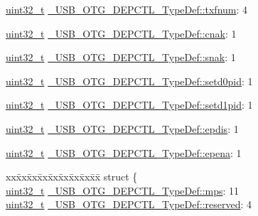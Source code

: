 \begin{DoxyCompactItemize}
\item 
\hyperlink{stdint_8h_a435d1572bf3f880d55459d9805097f62}{uint32\-\_\-t} \hyperlink{group___u_s_b___o_t_g___d_r_i_v_e_r_ga44558e437642307114827cdb9ca99c90}{\-\_\-\-U\-S\-B\-\_\-\-O\-T\-G\-\_\-\-D\-E\-P\-C\-T\-L\-\_\-\-Type\-Def\-::txfnum}\-: 4
\item 
\hyperlink{stdint_8h_a435d1572bf3f880d55459d9805097f62}{uint32\-\_\-t} \hyperlink{group___u_s_b___o_t_g___d_r_i_v_e_r_ga3e56a457c5ef0c5073133f6136baef92}{\-\_\-\-U\-S\-B\-\_\-\-O\-T\-G\-\_\-\-D\-E\-P\-C\-T\-L\-\_\-\-Type\-Def\-::cnak}\-: 1
\item 
\hyperlink{stdint_8h_a435d1572bf3f880d55459d9805097f62}{uint32\-\_\-t} \hyperlink{group___u_s_b___o_t_g___d_r_i_v_e_r_ga12a5b369b36732e560b814f77a5b4f28}{\-\_\-\-U\-S\-B\-\_\-\-O\-T\-G\-\_\-\-D\-E\-P\-C\-T\-L\-\_\-\-Type\-Def\-::snak}\-: 1
\item 
\hyperlink{stdint_8h_a435d1572bf3f880d55459d9805097f62}{uint32\-\_\-t} \hyperlink{group___u_s_b___o_t_g___d_r_i_v_e_r_ga5352bfdd79679f5fba2e20e336c0d48f}{\-\_\-\-U\-S\-B\-\_\-\-O\-T\-G\-\_\-\-D\-E\-P\-C\-T\-L\-\_\-\-Type\-Def\-::setd0pid}\-: 1
\item 
\hyperlink{stdint_8h_a435d1572bf3f880d55459d9805097f62}{uint32\-\_\-t} \hyperlink{group___u_s_b___o_t_g___d_r_i_v_e_r_gad8a3a72618af4a2c5134a74458fae380}{\-\_\-\-U\-S\-B\-\_\-\-O\-T\-G\-\_\-\-D\-E\-P\-C\-T\-L\-\_\-\-Type\-Def\-::setd1pid}\-: 1
\item 
\hyperlink{stdint_8h_a435d1572bf3f880d55459d9805097f62}{uint32\-\_\-t} \hyperlink{group___u_s_b___o_t_g___d_r_i_v_e_r_gab79051b0a8cc476d1e35fe02598a7989}{\-\_\-\-U\-S\-B\-\_\-\-O\-T\-G\-\_\-\-D\-E\-P\-C\-T\-L\-\_\-\-Type\-Def\-::epdis}\-: 1
\item 
\hyperlink{stdint_8h_a435d1572bf3f880d55459d9805097f62}{uint32\-\_\-t} \hyperlink{group___u_s_b___o_t_g___d_r_i_v_e_r_ga6cdb48720ad4a0114da47efd4055860b}{\-\_\-\-U\-S\-B\-\_\-\-O\-T\-G\-\_\-\-D\-E\-P\-C\-T\-L\-\_\-\-Type\-Def\-::epena}\-: 1
\item 
\begin{tabbing}
xx\=xx\=xx\=xx\=xx\=xx\=xx\=xx\=xx\=\kill
struct \{\\
\>\hyperlink{stdint_8h_a435d1572bf3f880d55459d9805097f62}{uint32\_t} \hyperlink{group___u_s_b___o_t_g___d_r_i_v_e_r_gaee25bec8b0ce21c22dc927bc651c0bcd}{\_USB\_OTG\_DEPCTL\_TypeDef::mps}: 11\\
\>\hyperlink{stdint_8h_a435d1572bf3f880d55459d9805097f62}{uint32\_t} \hyperlink{group___u_s_b___o_t_g___d_r_i_v_e_r_ga0ba2580866ac970f191b94772a602611}{\_USB\_OTG\_DEPCTL\_TypeDef::reserved}: 4\\

\end{tabbing}
\end{DoxyCompactItemize}
